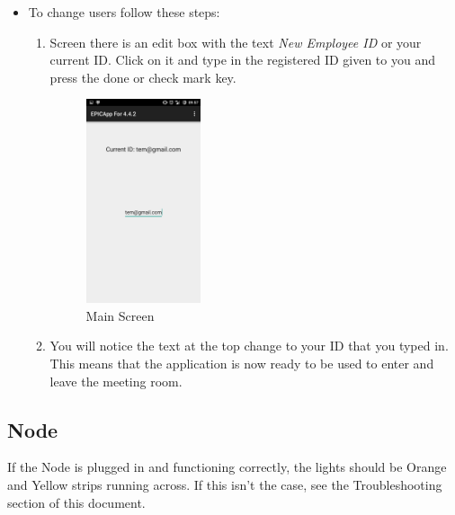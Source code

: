 \documentclass[a4paper,12pt,titlepage]{article}
\begin{document}
\begin{itemize}
\begin{enumerate}
            \end{enumerate}
        \item   To change users follow these steps:
            \begin{enumerate}
                \item{ Screen there is an edit box with the text \textit{New Employee ID} or your current ID. Click on it and type in the registered ID given to you and press the done or check mark key.
                    \begin{figure}[H]
                    \center
                    \includegraphics[height=6cm]{SecOpen}
                    \caption{Main Screen}
                    \label{fig:my_label4}
                    \end{figure}}
                \item You will notice the text at the top change to your ID that you typed in. This means that the application is now ready to be used to enter and leave the meeting room.
            \end{enumerate}
    \end{itemize}

\subsection{Node}
    If the Node is plugged in and functioning correctly, the lights should be Orange and Yellow strips running across. If this isn't the case, see the Troubleshooting section of this document.
    
\end{document}
